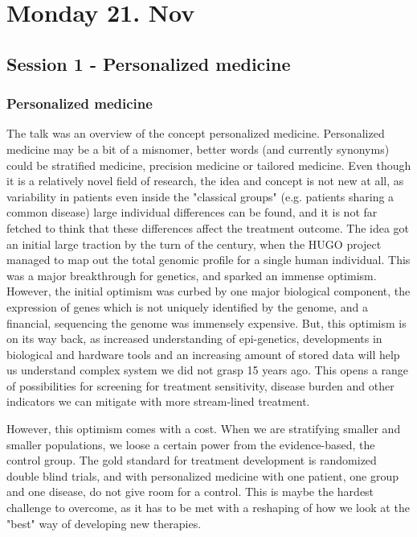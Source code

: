 \documentclass[12p]{article}
\begin{document}
\section*{Monday 21. Nov}

\subsection*{Session 1 - Personalized medicine}

\subsubsection*{Personalized medicine}

The talk was an overview of the concept personalized medicine.
Personalized medicine may be a bit of a misnomer, better words (and currently synonyms) could be stratified medicine, precision medicine or tailored medicine.
Even though it is a relatively novel field of research, the idea and concept is not new at all, as variability in patients even inside the "classical groups" (e.g. patients sharing a common disease) large individual differences can be found, and it is not far fetched to think that these differences affect the treatment outcome.
The idea got an initial large traction by the turn of the century, when the HUGO project managed to map out the total genomic profile for a single human individual.
This was a major breakthrough for genetics, and sparked an immense optimism.
However, the initial optimism was curbed by one major biological component, the expression of genes which is not uniquely identified by the genome, and a financial, sequencing the genome was immensely expensive.
But, this optimism is on its way back, as increased understanding of epi-genetics, developments in biological and hardware tools and an increasing amount of stored data will help us understand complex system we did not grasp 15 years ago.
This opens a range of possibilities for screening for treatment sensitivity, disease burden and other indicators we can mitigate with more stream-lined treatment.

However, this optimism comes with a cost.
When we are stratifying smaller and smaller populations, we loose a certain power from the evidence-based, the control group.
The gold standard for treatment development is randomized double blind trials, and with personalized medicine with one patient, one group and one disease, do not give room for a control.
This is maybe the hardest challenge to overcome, as it has to be met with a reshaping of how we look at the "best" way of developing new therapies.
\end{document}
